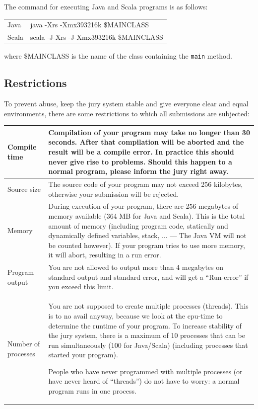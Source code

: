 The command for executing Java and Scala programs is as follows:
\begin{center}
\begin{tabular}{l|p{14cm}}
Java&
java -Xrs -Xmx393216k \$MAINCLASS\\
Scala&
scala -J-Xrs -J-Xmx393216k \$MAINCLASS \\
\end{tabular}
\end{center}
where \$MAINCLASS is the name of the class containing the \texttt{main} method.

\subsection{Restrictions}
To prevent abuse, keep the jury system stable and give everyone clear
and equal environments, there are some restrictions to which all
submissions are subjected:

\begin{center}
\begin{longtable}{|l|p{12cm}|}
\hline
Compile time&
Compilation of your program may take no longer than 30
seconds. After that compilation will be aborted and the result will
be a compile error. In practice this should never give rise to
problems. Should this happen to a normal program, please inform the
jury right away.\\\hline
Source size&
The source code of your program may not exceed 256 kilobytes,
otherwise your submission will be rejected.\\\hline
Memory&
During execution of your program, there are 256 megabytes of
memory available (364 MB for Java and Scala). This is the total amount of memory (including
program code, statically and dynamically defined variables, stack,
$\dots$ --- The Java VM will not be counted however).
If your program tries to use more memory, it will
abort, resulting in a run error.
\\\hline
Program output&
You are not allowed to output more than 4 megabytes
on standard output and standard error, and will get a ``Run-error''
if you exceed this limit.\\\hline
Number of processes&
You are not supposed to create multiple processes (threads). This is
to no avail anyway, because we look at the cpu-time to determine the runtime of your program.
To increase stability of the jury system, there is a
maximum of 10 processes that can be run simultaneously (100 for Java/Scala)
(including processes that started your program).

People who have never programmed with multiple processes (or have
never heard of ``threads'') do not have to worry: a normal program
runs in one process.\\\hline
\end{longtable}
\end{center}

